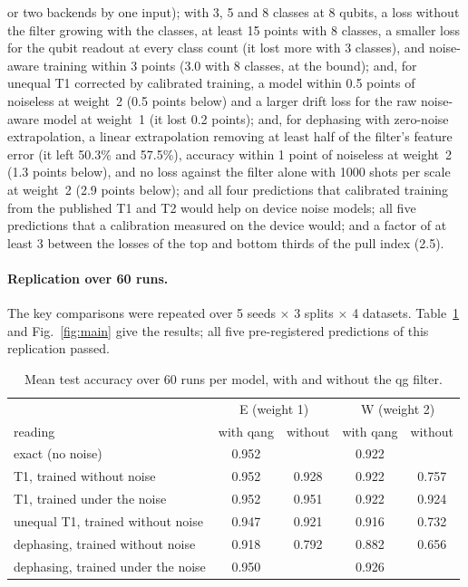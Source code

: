 \documentclass[11pt]{article}
\begin{document}
\begin{itemize}
  or two backends by one input); with 3, 5 and 8 classes at 8 qubits, a loss without the filter growing with the
  classes, at least 15 points with 8 classes, a smaller loss for the qubit readout at every class count (it lost
  more with 3 classes), and noise-aware training within 3 points (3.0 with 8 classes, at the bound); and, for
  unequal T1 corrected by calibrated training, a model within 0.5 points of noiseless at weight~2 (0.5 points
  below) and a larger drift loss for the raw noise-aware model at weight~1 (it lost 0.2 points); and, for dephasing
  with zero-noise extrapolation, a linear extrapolation removing at least half of the filter's feature error (it left
  50.3\% and 57.5\%), accuracy within 1 point of noiseless at weight~2 (1.3 points below), and no loss against the filter
  alone with 1000 shots per scale at weight~2 (2.9 points below); and all four predictions that calibrated training
  from the published T1 and T2 would help on device noise models; all five predictions that a calibration measured on
  the device would; and a factor of at least 3 between the losses of the top and bottom thirds of the pull index
  (2.5).
\end{itemize}

\paragraph{Replication over 60 runs.} The key comparisons were repeated over 5 seeds $\times$ 3 splits
$\times$ 4 datasets. Table~\ref{tab:main} and Fig.~\ref{fig:main} give the results; all five
pre-registered predictions of this replication passed.

\begin{table}[h]
\centering\small
\begin{tabular}{lcccc}
\toprule
 & \multicolumn{2}{c}{E (weight 1)} & \multicolumn{2}{c}{W (weight 2)}\\
reading & with qang & without & with qang & without\\
\midrule
exact (no noise) & 0.952 & & 0.922 & \\
T1, trained without noise & 0.952 & 0.928 & 0.922 & 0.757\\
T1, trained under the noise & 0.952 & 0.951 & 0.922 & 0.924\\
unequal T1, trained without noise & 0.947 & 0.921 & 0.916 & 0.732\\
dephasing, trained without noise & 0.918 & 0.792 & 0.882 & 0.656\\
dephasing, trained under the noise & 0.950 & & 0.926 & \\
\bottomrule
\end{tabular}
\caption{Mean test accuracy over 60 runs per model, with and without the qg filter.}
\label{tab:main}
\end{table}
\end{document}
